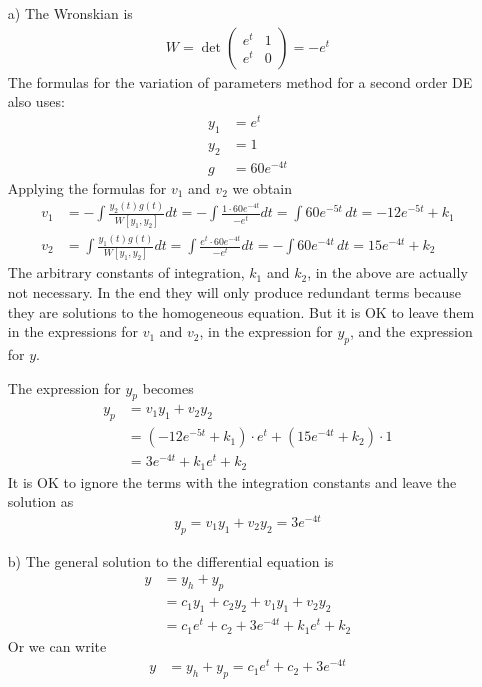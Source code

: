 \begin{enumerate}
    \item[a)] The Wronskian is
\begin{align}
    W = \det \begin{pmatrix} e^t&1\\e^t&0\end{pmatrix} = -e^t
\end{align}
The formulas for the variation of parameters method for a second order DE also uses:
\begin{align}
    y_1 & = e^t \\
    y_2 &= 1 \\
    g &= 60e^{-4t} 
\end{align}
Applying the formulas for $v_1$ and $v_2$ we obtain
\begin{align}
    v_1 &= - \int \frac{y_2(t)g(t)}{W[y_1,y_2]}dt 
    = - \int \frac{1 \cdot 60e^{-4t}}{-e^t} dt 
    = \int 60e^{-5t} \, dt 
    = -12e^{-5t} + k_1\\
    v_2 &= \int \frac{y_1(t)g(t)}{W[y_1,y_2]} dt 
    = \int \frac{e^t\cdot60e^{-4t}}{-e^t} dt 
    = - \int 60 e^{-4t}\, dt 
    = 15e^{-4t} + k_2
\end{align}
The arbitrary constants of integration, $k_1$ and $k_2$, in the above are actually not necessary. In the end they will only produce redundant terms because they are solutions to the homogeneous equation. But it is OK to leave them in the expressions for $v_1$ and $v_2$, in the expression for $y_p$, and the expression for $y$. 

The expression for $y_p$ becomes
\begin{align}
    y_p &= v_1y_1 + v_2y_2 \\
    &= (-12e^{-5t} + k_1)\cdot e^t + (15e^{-4t} + k_2) \cdot 1 \\
    &= 3e^{-4t} + k_1e^t + k_2
\end{align}
It is OK to ignore the terms with the integration constants and leave the solution as
\begin{align}
    y_p = v_1y_1 + v_2y_2 = 3e^{-4t}
\end{align}
\item [b)] The general solution to the differential equation is
\begin{align}
    y &= y_h + y_p \\
    &= c_1y_1 + c_2y_2 + v_1y_1 + v_2y_2 \\
    &= c_1e^t +c_2 + 3e^{-4t} + k_1e^t + k_2
\end{align}
Or we can write
\begin{align}
    y &= y_h + y_p  = c_1e^t +c_2 + 3e^{-4t} 
\end{align}
\end{enumerate}